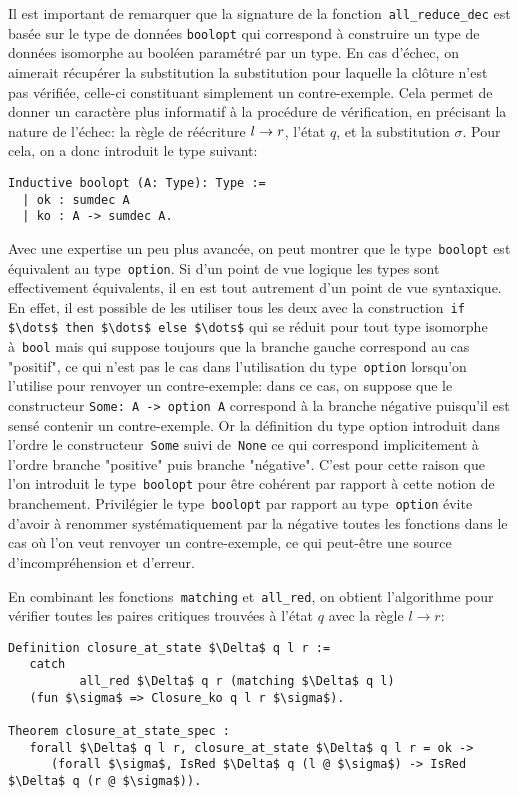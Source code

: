 Il est important de remarquer que la signature de la fonction~\lstinline!all_reduce_dec! est basée
sur le type de données \lstinline!boolopt! qui correspond à construire un type de données
isomorphe au booléen paramétré par un type. En cas d'échec, 
on aimerait récupérer la substitution la substitution pour laquelle la clôture n'est pas vérifiée, celle-ci
constituant simplement un contre-exemple. Cela permet de donner un caractère plus informatif à la procédure
de vérification, en précisant la nature de l'échec: la règle de réécriture $l \rightarrow r$, l'état $q$, et la substitution $\sigma$. 
Pour cela, on a donc introduit le type suivant:
\begin{lstlisting}
Inductive boolopt (A: Type): Type :=
  | ok : sumdec A
  | ko : A -> sumdec A.
\end{lstlisting}
Avec une expertise un peu plus avancée, on peut montrer que  le type~\lstinline!boolopt! est
équivalent au type~\lstinline!option!. Si d'un point de vue logique les types sont effectivement équivalents,
il en est tout autrement d'un point de vue syntaxique. En effet, il est possible de les utiliser tous les deux
avec la construction~\lstinline!if $\dots$ then $\dots$ else $\dots$! qui se réduit pour tout type isomorphe
à~\lstinline!bool! mais qui suppose toujours que la branche gauche correspond au cas "positif", ce qui n'est pas le cas
dans l'utilisation du type~\lstinline!option! lorsqu'on l'utilise pour renvoyer un contre-exemple: dans ce cas, on suppose
que le constructeur \lstinline!Some: A -> option A! correspond à la branche négative puisqu'il est sensé contenir un
contre-exemple. Or la définition du type option introduit dans l'ordre le constructeur~\lstinline!Some! suivi 
de~\lstinline!None! ce qui correspond implicitement à l'ordre branche "positive" puis branche "négative".
C'est pour cette raison que l'on introduit le type~\lstinline!boolopt! pour être cohérent par rapport à cette notion
de branchement. Privilégier le type~\lstinline!boolopt! par rapport au type~\lstinline!option! évite d'avoir à renommer
systématiquement par la négative toutes les fonctions dans le cas où l'on veut renvoyer un contre-exemple, 
ce qui peut-être une source d'incompréhension et d'erreur. 

En combinant les fonctions~\lstinline!matching! et~\lstinline!all_red!, 
on obtient l'algorithme pour vérifier toutes les paires critiques 
trouvées à l'état $q$ avec la règle $l \rightarrow r$:

\begin{lstlisting}
Definition closure_at_state $\Delta$ q l r := 
   catch
          all_red $\Delta$ q r (matching $\Delta$ q l)
   (fun $\sigma$ => Closure_ko q l r $\sigma$).

Theorem closure_at_state_spec : 
   forall $\Delta$ q l r, closure_at_state $\Delta$ q l r = ok -> 
      (forall $\sigma$, IsRed $\Delta$ q (l @ $\sigma$) -> IsRed $\Delta$ q (r @ $\sigma$)).
\end{lstlisting}

